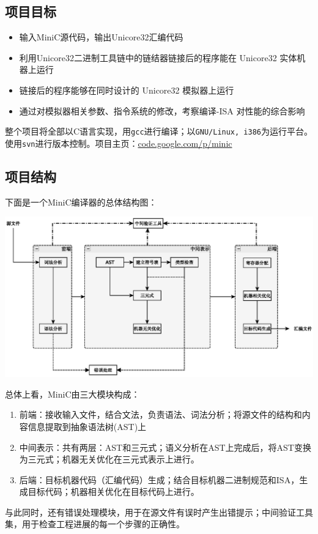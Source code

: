 \subsection*{项目目标}
\begin{itemize}
	\item 输入MiniC源代码，输出Unicore32汇编代码
	\item 利用Unicore32二进制工具链中的链结器链接后的程序能在 Unicore32 实体机器上运行
	\item 链接后的程序能够在同时设计的 Unicore32 模拟器上运行
	\item 通过对模拟器相关参数、指令系统的修改，考察编译-ISA 对性能的综合影响
\end{itemize}
整个项目将全部以C语言实现，用\verb|gcc|进行编译；以\verb|GNU/Linux, i386|为运行平台。使用\verb|svn|进行版本控制。项目主页：\href{http://code.google.com/p/minic}{code.google.com/p/minic}
\subsection*{项目结构}
下面是一个MiniC编译器的总体结构图：
\begin{center}
\includegraphics[scale=0.7]{main_structure.eps}
\end{center}
总体上看，MiniC由三大模块构成：
\begin{enumerate}
\item 前端：接收输入文件，结合文法，负责语法、词法分析；将源文件的结构和内容信息提取到抽象语法树(AST)上
\item 中间表示：共有两层：AST和三元式；语义分析在AST上完成后，将AST变换为三元式；机器无关优化在三元式表示上进行。
\item 后端：目标机器代码（汇编代码）生成；结合目标机器二进制规范和ISA，生成目标代码；机器相关优化在目标代码上进行。
\end{enumerate}
与此同时，还有错误处理模块，用于在源文件有误时产生出错提示；中间验证工具集，用于检查工程进展的每一个步骤的正确性。

